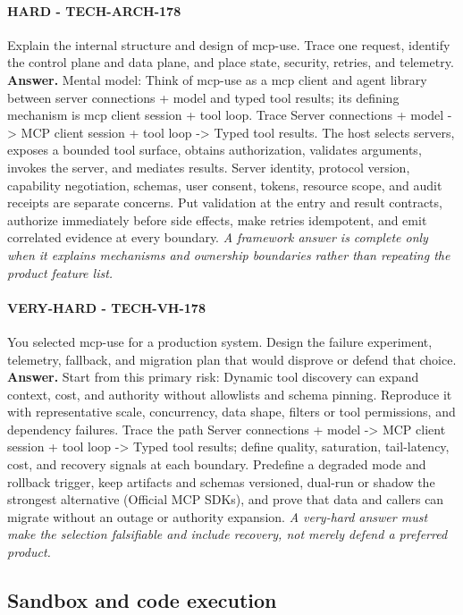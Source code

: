 \paragraph{HARD - TECH-ARCH-178} Explain the internal structure and design of mcp-use. Trace one request, identify the control plane and data plane, and place state, security, retries, and telemetry.
\textbf{Answer.} Mental model: Think of mcp-use as a mcp client and agent library between server connections + model and typed tool results; its defining mechanism is mcp client session + tool loop. Trace Server connections + model -> MCP client session + tool loop -> Typed tool results. The host selects servers, exposes a bounded tool surface, obtains authorization, validates arguments, invokes the server, and mediates results. Server identity, protocol version, capability negotiation, schemas, user consent, tokens, resource scope, and audit receipts are separate concerns. Put validation at the entry and result contracts, authorize immediately before side effects, make retries idempotent, and emit correlated evidence at every boundary.
\textit{A framework answer is complete only when it explains mechanisms and ownership boundaries rather than repeating the product feature list.}
\paragraph{VERY-HARD - TECH-VH-178} You selected mcp-use for a production system. Design the failure experiment, telemetry, fallback, and migration plan that would disprove or defend that choice.
\textbf{Answer.} Start from this primary risk: Dynamic tool discovery can expand context, cost, and authority without allowlists and schema pinning. Reproduce it with representative scale, concurrency, data shape, filters or tool permissions, and dependency failures. Trace the path Server connections + model -> MCP client session + tool loop -> Typed tool results; define quality, saturation, tail-latency, cost, and recovery signals at each boundary. Predefine a degraded mode and rollback trigger, keep artifacts and schemas versioned, dual-run or shadow the strongest alternative (Official MCP SDKs), and prove that data and callers can migrate without an outage or authority expansion.
\textit{A very-hard answer must make the selection falsifiable and include recovery, not merely defend a preferred product.}
\subsection{Sandbox and code execution}
